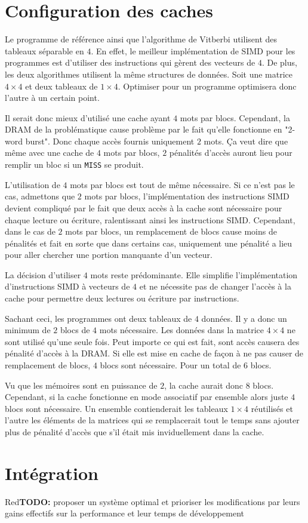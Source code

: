 \documentclass[a11paper]{article}
\newcommand{\todo}[1]{\begin{color}{Red}\textbf{TODO:} #1\end{color}}
\begin{document}
\section{Configuration des caches}
Le programme de référence ainsi que l'algorithme de Vitberbi utilisent des
tableaux séparable en $4$. En effet, le meilleur implémentation de SIMD pour
les programmes est d'utiliser des instructions qui gèrent des vecteurs de $4$.
De plus, les deux algorithmes utilisent la même structures de données. Soit une
matrice $4\times4$ et deux tableaux de $1\times4$. Optimiser pour un programme
optimisera donc l'autre à un certain point.

Il serait donc mieux d'utilisé une cache ayant $4$ mots par blocs.
Cependant, la DRAM de la problématique cause problème par le fait qu'elle
fonctionne en "2-word burst". Donc chaque accès fournis uniquement $2$ mots.
Ça veut dire que même avec une cache de $4$ mots par blocs, $2$ pénalités
d'accès auront lieu pour remplir un bloc si un \verb|MISS| se produit.

L'utilisation de $4$ mots par blocs est tout de même nécessaire. Si ce n'est
pas le cas, admettons que $2$ mots par blocs, l'implémentation des instructions
SIMD devient compliqué par le fait que deux accès à la cache sont nécessaire
pour chaque lecture ou écriture, ralentissant ainsi les instructions SIMD.
Cependant, dans le cas de $2$ mots par blocs, un remplacement de blocs cause
moins de pénalités et fait en sorte que dans certains cas, uniquement une
pénalité a lieu pour aller chercher une portion manquante d'un vecteur.

La décision d'utiliser $4$ mots reste prédominante. Elle simplifie
l'implémentation d'instructions SIMD à vecteurs de $4$ et ne nécessite pas de
changer l'accès à la cache pour permettre deux lectures ou écriture par
instructions.

Sachant ceci, les programmes ont deux tableaux de $4$ données. Il y a donc un
minimum de $2$ blocs de $4$ mots nécessaire. Les données dans la matrice
$4\times4$ ne sont utilisé qu'une seule fois. Peut importe ce qui est fait,
sont accès causera des pénalité d'accès à la DRAM. Si elle est mise en cache de
façon à ne pas causer de remplacement de blocs, $4$ blocs sont nécessaire. Pour
un total de $6$ blocs.

Vu que les mémoires sont en puissance de $2$, la cache aurait donc $8$ blocs.
Cependant, si la cache fonctionne en mode associatif par ensemble alors juste
$4$ blocs sont nécessaire. Un ensemble contienderait les tableaux $1\times4$
réutilisés et l'autre les éléments de la matrices qui se remplacerait tout le
temps sans ajouter plus de pénalité d'accès que s'il était mis inviduellement
dans la cache.


\section{Intégration}

\todo{proposer un système optimal et prioriser les modifications par leurs
gains effectifs sur la performance et leur temps de développement}
\end{document}

